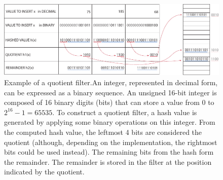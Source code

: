 \begin{figure}[h!]
	\centering
	\includegraphics[width=.95\linewidth]{figures/kmer_methods/quotient_filter_export.pdf}
	\caption[Example of a quotient filter.]{Example of a quotient filter.An integer, represented in decimal form, can be expressed as a binary sequence. An unsigned 16-bit integer is composed of 16 binary digits (bits) that can store a value from $0$ to $2^{16}-1 = 65535$. To construct a quotient filter, a hash value is generated by applying some binary operations on this integer. From the computed hash value, the leftmost 4 bits are considered the quotient (although, depending on the implementation, the rightmost bits could be used instead). The remaining bits from the hash form the remainder. The remainder is stored in the filter at the position indicated by the quotient. }
	\label{fig:qf_ex}
\end{figure}
